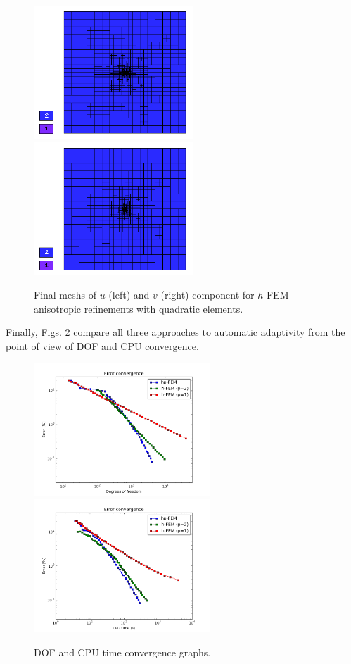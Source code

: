 \begin{figure}[!ht]
\centering
\includegraphics[height=5cm]{nist/nist-3/mesh_u_h2_aniso.png}\ \
\includegraphics[height=5cm]{nist/nist-3/mesh_v_h2_aniso.png}
\caption{Final meshs of $u$ (left) and $v$ (right) component for $h$-FEM anisotropic refinements with quadratic elements.}
\label{fig:nist-3-h2-aniso}
\end{figure}

Finally, Figs. \ref{fig:nist-3-conv} compare all
three approaches to automatic adaptivity from the point
of view of DOF and CPU convergence.

\begin{figure}[!ht]
\centering
\includegraphics[height=5cm]{nist/nist-3/conv_dof_aniso.png}\ \
\includegraphics[height=5cm]{nist/nist-3/conv_cpu_aniso.png}
\caption{DOF and CPU time convergence graphs.}
\label{fig:nist-3-conv}
\end{figure}

